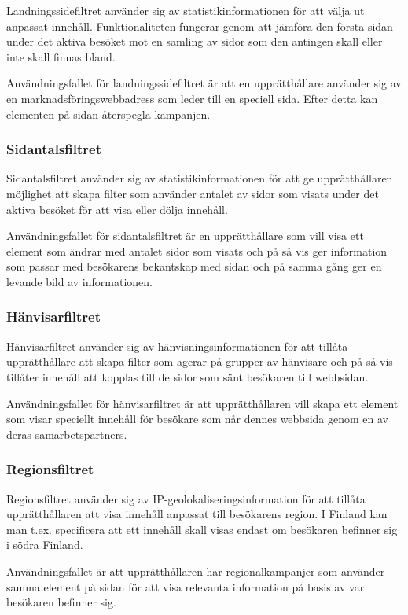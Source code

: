 Landningssidefiltret använder sig av statistikinformationen för att välja ut anpassat innehåll. Funktionaliteten fungerar genom att jämföra den första sidan under det aktiva besöket mot en samling av sidor som den antingen skall eller inte skall finnas bland.

Användningsfallet för landningssidefiltret är att en upprätthållare använder sig av en marknadsföringswebbadress som leder till en speciell sida. Efter detta kan elementen på sidan återspegla kampanjen.

\subsubsection{Sidantalsfiltret}

Sidantalsfiltret använder sig av statistikinformationen för att ge upprätthållaren möjlighet att skapa filter som använder antalet av sidor som visats under det aktiva besöket för att visa eller dölja innehåll.

Användningsfallet för sidantalsfiltret är en upprätthållare som vill visa ett element som ändrar med antalet sidor som visats och på så vis ger information som passar med besökarens bekantskap med sidan och på samma gång ger en levande bild av informationen.

\subsubsection{Hänvisarfiltret}

Hänvisarfiltret använder sig av hänvisningsinformationen för att tillåta upprätthållare att skapa filter som agerar på grupper av hänvisare och på så vis tillåter innehåll att kopplas till de sidor som sänt besökaren till webbsidan.

Användningsfallet för hänvisarfiltret är att upprätthållaren vill skapa ett element som visar speciellt innehåll för besökare som når dennes webbsida genom en av deras samarbetspartners.

\subsubsection{Regionsfiltret}

Regionsfiltret använder sig av IP-geolokaliseringsinformation för att tillåta upprätthållaren att visa innehåll anpassat till besökarens region. I Finland kan man t.ex. specificera att ett innehåll skall visas endast om besökaren befinner sig i södra Finland.

Användningsfallet är att upprätthållaren har regionalkampanjer som använder samma element på sidan för att visa relevanta information på basis av var besökaren befinner sig.

